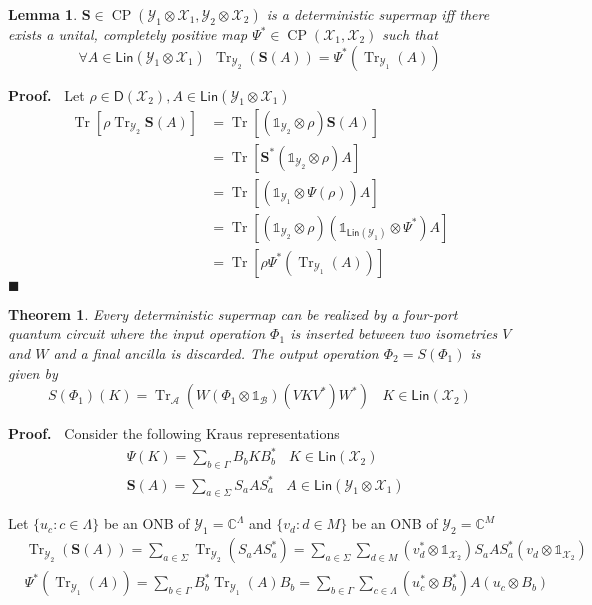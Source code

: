 \documentclass[aps,pra,onecolumn,notitlepage,superscriptaddress]{revtex4-1}
\newcommand{\C}{\mathbb{C}}
\newcommand{\spc}[1]{\mathcal{#1}}
\newcommand{\Lin}{\mathsf{Lin}}
\newcommand{\D}{\mathsf{D}}
\newcommand{\bs}[1]{\boldsymbol{#1}}
\newcommand{\Tr}{\operatorname{Tr}}
\newcommand{\op}[1]{\operatorname{#1}}
\newcommand\I{\mathds{1}}
\newtheorem{theo}{Theorem}
\newtheorem{lemma}{Lemma}
\def\Proof{{\bf Proof.~}}
\def\qed{$\blacksquare$ \newline}
\begin{document}
    \begin{lemma}
        $\bs{S} \in  \op{CP}(\spc Y_1 \otimes \spc X_1, \spc Y_2 \otimes \spc X_2)$ is a deterministic supermap iff there exists a unital, completely positive map $\Psi^* \in \op{CP}(\spc X_1, \spc X_2)$ such that
        \begin{equation}
            \forall A \in \Lin(\spc Y_1 \otimes \spc X_1) \ \ \Tr_{\spc Y_2}(\bs{S}(A)) = \Psi^*(\Tr_{\spc Y_1}(A))
        \end{equation}
    \end{lemma}

    \Proof {
        Let $\rho \in \D(\spc X_2), A \in \Lin(\spc Y_1 \otimes \spc X_1)$
        \begin{align*}
            \Tr[ \rho \Tr_{\spc Y_2} \bs{S}(A) ]
            &= \Tr[ (\I_{\spc Y_2} \otimes \rho) \bs{S}(A) ] \\
            &= \Tr[ \bs{S}^*(\I_{\spc Y_2} \otimes \rho) A ] \\
            &= \Tr[ (\I_{\spc Y_1} \otimes \Psi(\rho)) A ] \\
            &= \Tr[ (\I_{\spc Y_2} \otimes \rho) (\I_{\Lin(\spc Y_1)} \otimes \Psi^*) A ] \\
            &= \Tr[ \rho \Psi^* (\Tr_{\spc Y_1}(A)) ]
        \end{align*}
    } \qed

    \begin{theo}
        Every deterministic supermap can be realized by a four-port quantum circuit where the input operation $\Phi_1$ is inserted between two isometries $V$ and $W$ and a final ancilla is discarded. The output operation $\Phi_2 = S(\Phi_1)$ is given by
        \begin{equation}
            S(\Phi_1)(K) = \Tr_{\spc A} (W (\Phi_1 \otimes \I_{\spc B})(VKV^*) W^*) \ \ \ \ K \in \Lin(\spc X_2)
        \end{equation}
    \end{theo}
    \Proof
    Consider the following Kraus representations
    \begin{align}
        &\Psi(K) = \sum_{b \in \Gamma} B_b K B_b^* \ \ \ \ K 
        \in \Lin(\spc X_2) \\
        &\bs{S}(A) = \sum_{a \in \Sigma} S_a A S_a^* \ \ \ \ A \in \Lin(\spc Y_1 \otimes \spc X_1)
    \end{align}
    
    Let $\{u_c : c \in \Lambda\}$ be an ONB of $\spc Y_1 = \C^\Lambda$ and $\{v_d : d \in M \}$ be an ONB of $\spc Y_2 = \C^M$
    \begin{align*}
        & \Tr_{\spc Y_2} (\bs{S}(A)) = \sum_{a \in \Sigma} \Tr_{\spc Y_2} (S_a A S_a^*) = \sum_{a \in \Sigma}\sum_{d \in M} (v_d^* \otimes \I_{\spc X_2}) S_a A S_a^* (v_d \otimes \I_{\spc X_2}) \\
        & \Psi^*(\Tr_{\spc Y_1}(A)) = \sum_{b \in \Gamma} B_b^* \Tr_{\spc Y_1}(A) B_b = \sum_{b \in \Gamma} \sum_{c \in \Lambda} (u_c^* \otimes B_b^*) A (u_c \otimes B_b)
    \end{align*}
\end{document}
